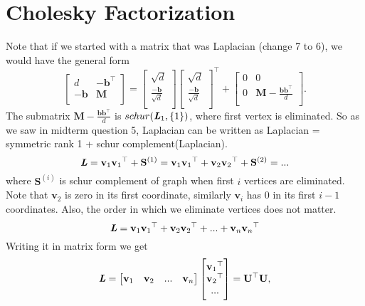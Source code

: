 \documentclass[11pt]{article}
\renewcommand{\tr}[1]{\ensuremath{{#1}}^{\top}}
\begin{document}
\section{Cholesky Factorization}
Note that if we started with a matrix that was Laplacian (change 7 to 6), we would have the general form
\begin{equation*}
\left[
\begin{matrix}
d & \tr {-\mathbf{b}}\\
-\mathbf{b} & \mathbf{M}\\
\end{matrix}
\right]
= 
\left[
\begin{matrix}
\sqrt {d} \\
\frac {-\mathbf{b}}{\sqrt{d}}\\
\end{matrix}
\right]
\tr {
\left[
\begin{matrix}
\sqrt {d} \\
\frac {-\mathbf{b}}{\sqrt{d}}\\
\end{matrix}
\right]} +
\left[
\begin{matrix}
0 & 0\\
0 & \mathbf{M} - \frac {\mathbf{b}\tr {\mathbf{b}}}{d}\\
\end{matrix}
\right].
\end{equation*}
The submatrix $\mathbf{M} - \frac {\mathbf{b}\tr {\mathbf{b}}}{d}$ is $schur(\boldsymbol{\mathit{L}}_1,\{1\})$, where first vertex is eliminated. So as we saw in midterm question 5, Laplacian can be written as
Laplacian = symmetric rank 1 + schur complement(Laplacian).\newline
\[\LL = \mathbf{v}_1 \tr{\mathbf{v}_1} + \mathbf{S}^{(1)} = \mathbf{v}_1 \tr{\mathbf{v}_1} + \mathbf{v}_2 \tr{\mathbf{v}_2} + \mathbf{S}^{(2)} = ...\] where $\mathbf{S}^{(i)}$ is schur complement of graph when first $i$ vertices are eliminated. 
Note that $\mathbf{v}_2$ is zero in its first coordinate, similarly $\mathbf{v}_i$ has 0 in its first $i-1$ coordinates. Also, the order in which we eliminate vertices does not matter. 
\[\LL = \mathbf{v}_1 \tr{\mathbf{v}_1} + \mathbf{v}_2 \tr{\mathbf{v}_2} + ... + \mathbf{v}_n \tr{\mathbf{v}_n}\] 
Writing it in matrix form we get
\begin{equation*}
\LL = 
\left[
\begin{matrix}
\mathbf{v}_1 & \mathbf{v}_2& ...&\mathbf{v}_n\\
\end{matrix}
\right]
\left[
\begin{matrix}
\tr {\mathbf{v}_1}\\
\tr {\mathbf{v}_2}\\
...\\
\end{matrix}
\right] = 
\tr{\mathbf{U}} \mathbf{U},
\end{equation*}
\end{document}
